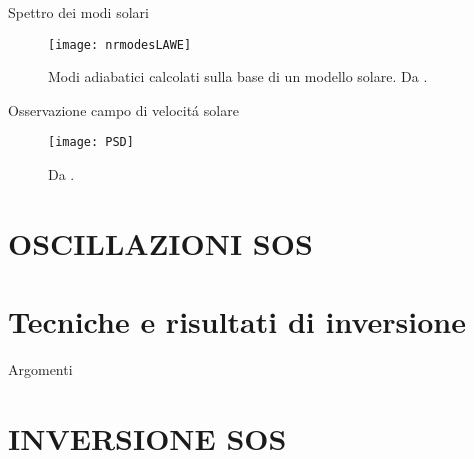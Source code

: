 \documentclass[10pt,xcolor={usenames},fleqn,mathserif,serif]{beamer}
\begin{document}
\begin{frame}{Spettro dei modi solari}

\begin{figure}[!ht]




\texttt{[image: nrmodesLAWE]}
\caption{Modi adiabatici calcolati sulla base di un modello solare. Da \cite{chr02helioseismology}.}\label{fig:nrmodesLAWE}

\end{figure}

\end{frame}

\begin{frame}{Osservazione campo di velocit\'a solare}

\begin{figure}[!ht]




\texttt{[image: PSD]}
\caption{Da \cite{houdek2006stochastic06}.}\label{fig:PSD}

\end{figure}

\end{frame}

\part{OSCILLAZIONI SOS}


\part{Tecniche e risultati di inversione}\label{part:inverseproblem}

\frame{\partpage}

\begin{frame}{Argomenti}
  \tableofcontents[part=3,hideallsubsections%
  ]
\end{frame}

\part{INVERSIONE SOS}


\end{document}
